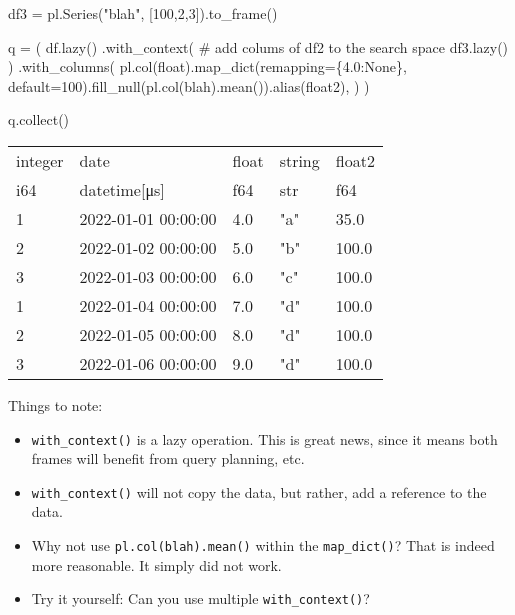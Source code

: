\documentclass[
  letterpaper,
  DIV=11,
  numbers=noendperiod]{scrartcl}
\newenvironment{Shaded}{\begin{snugshade}}{\end{snugshade}}
\newcommand{\CommentTok}[1]{\textcolor[rgb]{0.37,0.37,0.37}{#1}}
\newcommand{\DecValTok}[1]{\textcolor[rgb]{0.68,0.00,0.00}{#1}}
\newcommand{\FloatTok}[1]{\textcolor[rgb]{0.68,0.00,0.00}{#1}}
\newcommand{\NormalTok}[1]{\textcolor[rgb]{0.00,0.23,0.31}{#1}}
\newcommand{\OperatorTok}[1]{\textcolor[rgb]{0.37,0.37,0.37}{#1}}
\newcommand{\StringTok}[1]{\textcolor[rgb]{0.13,0.47,0.30}{#1}}
\newcommand{\VariableTok}[1]{\textcolor[rgb]{0.07,0.07,0.07}{#1}}
\providecommand{\tightlist}{%
  \setlength{\itemsep}{0pt}\setlength{\parskip}{0pt}}\usepackage{longtable,booktabs,array}
\begin{document}
\begin{Shaded}
\begin{Highlighting}[]
\NormalTok{df3 }\OperatorTok{=}\NormalTok{ pl.Series(}\StringTok{"blah"}\NormalTok{, [}\DecValTok{100}\NormalTok{,}\DecValTok{2}\NormalTok{,}\DecValTok{3}\NormalTok{]).to\_frame()}

\NormalTok{q }\OperatorTok{=}\NormalTok{ (}
\NormalTok{    df.lazy()}
\NormalTok{    .with\_context( }\CommentTok{\# add colums of df2 to the search space}
\NormalTok{        df3.lazy()}
\NormalTok{        )}
\NormalTok{    .with\_columns(}
\NormalTok{        pl.col(}\StringTok{\textquotesingle{}float\textquotesingle{}}\NormalTok{).map\_dict(remapping}\OperatorTok{=}\NormalTok{\{}\FloatTok{4.0}\NormalTok{:}\VariableTok{None}\NormalTok{\}, default}\OperatorTok{=}\DecValTok{100}\NormalTok{).fill\_null(pl.col(}\StringTok{\textquotesingle{}blah\textquotesingle{}}\NormalTok{).mean()).alias(}\StringTok{\textquotesingle{}float2\textquotesingle{}}\NormalTok{),}
\NormalTok{        )}
\NormalTok{    )}

\NormalTok{q.collect()}
\end{Highlighting}
\end{Shaded}

\begin{longtable}[]{@{}lllll@{}}
\toprule()
integer & date & float & string & float2 \\
i64 & datetime{[}μs{]} & f64 & str & f64 \\
\midrule()
\endhead
1 & 2022-01-01 00:00:00 & 4.0 & "a" & 35.0 \\
2 & 2022-01-02 00:00:00 & 5.0 & "b" & 100.0 \\
3 & 2022-01-03 00:00:00 & 6.0 & "c" & 100.0 \\
1 & 2022-01-04 00:00:00 & 7.0 & "d" & 100.0 \\
2 & 2022-01-05 00:00:00 & 8.0 & "d" & 100.0 \\
3 & 2022-01-06 00:00:00 & 9.0 & "d" & 100.0 \\
\bottomrule()
\end{longtable}

Things to note:

\begin{itemize}
\tightlist
\item
  \texttt{with\_context()} is a lazy operation. This is great news,
  since it means both frames will benefit from query planning, etc.
\item
  \texttt{with\_context()} will not copy the data, but rather, add a
  reference to the data.
\item
  Why not use
  \texttt{pl.col(\textquotesingle{}blah\textquotesingle{}).mean()}
  within the \texttt{map\_dict()}? That is indeed more reasonable. It
  simply did not work.
\item
  Try it yourself: Can you use multiple \texttt{with\_context()}?
\end{itemize}
\end{document}
